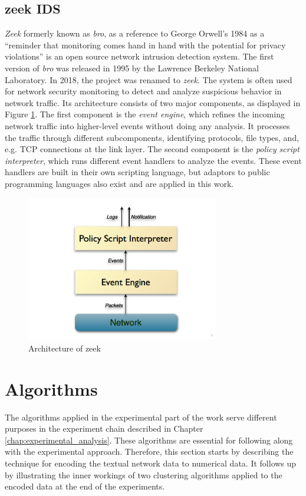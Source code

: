 \documentclass[
    fontsize=12pt,
    headings=small,
    parskip=half,           %
    bibliography=totoc,
    numbers=noenddot,       %
    open=any,               %
    ]{scrreprt}
\begin{document}
\subsection{zeek IDS}
\emph{Zeek} formerly known as \emph{bro}, as a reference to George Orwell's 1984 as a ``reminder that monitoring comes hand in hand with the potential for privacy violations'' \cite{zeek2023} is an open source network intrusion detection system. The first version of \emph{bro} was released in 1995 by the Lawrence Berkeley National Laboratory. In 2018, the project was renamed to \emph{zeek}. The system is often used for network security monitoring to detect and analyze suspicious behavior in network traffic. Its architecture consists of two major components, as displayed in Figure \ref{fig:zeek_architecture}. The first component is the \emph{event engine}, which refines the incoming network traffic into higher-level events without doing any analysis. It processes the traffic through different subcomponents, identifying protocols, file types, and, e.g. TCP connections at the link layer. The second component is the \emph{policy script interpreter}, which runs different event handlers to analyze the events. These event handlers are built in their own scripting language, but adaptors to public programming languages also exist and are applied in this work.

\begin{figure}[ht]
	\sffamily\footnotesize
	\includegraphics[width=0.75\textwidth]{pic/zeek_architecture.png}
	\unitlength=0.75mm
	\linethickness{0.4pt}
	\caption{Architecture of zeek \cite{zeek2023}}
	\label{fig:zeek_architecture}
\end{figure}

\section{Algorithms}
The algorithms applied in the experimental part of the work serve different purposes in the experiment chain described in Chapter \ref{chap:experimental_analysis}. These algorithms are essential for following along with the experimental approach. Therefore, this section starts by describing the technique for encoding the textual network data to numerical data. It follows up by illustrating the inner workings of two clustering algorithms applied to the encoded data at the end of the experiments.
\end{document}
